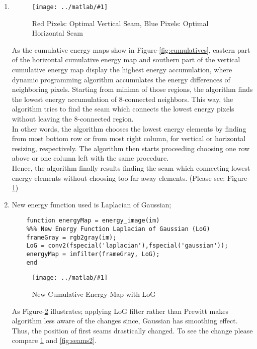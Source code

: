 \documentclass{article}
\newcommand{\listFigure}[3]{
	\begin{figure}[H]
		\texttt{[image: ../matlab/\#1]}
		\caption{#2\label{fig:#3}}
	\end{figure}		
}
\begin{document}
\begin{enumerate}
	\item
	\listFigure{seams.png}{Red Pixels: Optimal Vertical Seam, Blue
	Pixels: Optimal Horizontal Seam}{seams}
	As the cumulative energy maps show in Figure-\ref{fig:cumulatives}, eastern
	part of the horizontal cumulative energy map and southern part of the vertical
	cumulative energy map display the highest energy accumulation, where dynamic
	programming algorithm accumulates the energy differences of neighboring pixels.
	Starting from minima of those regions, the algorithm finds the lowest energy
	accumulation of 8-connected neighbors. This way, the algorithm tries to find
	the seam which connects the lowest energy pixels without leaving the
	8-connected region. \\
	In other words, the algorithm chooses the lowest energy
	elements by finding from most bottom row or from most right column, for
	vertical or horizontal resizing, respectively. The algorithm then starts proceeding
	choosing one row above or one column left with the same procedure. \\
	Hence, the algorithm finally results finding the seam which connecting lowest
	energy elements without choosing too far away elements.
	(Please see: Figure-\ref{fig:seams})
	\item
	New energy function used is Laplacian of Gaussian;
	\begin{lstlisting}
	function energyMap = energy_image(im)
	%%% New Energy Function Laplacian of Gaussian (LoG)
	frameGray = rgb2gray(im);  
	LoG = conv2(fspecial('laplacian'),fspecial('gaussian'));
	energyMap = imfilter(frameGray, LoG); 
	end		
	\end{lstlisting}	
	\listFigure{cumulatives-2.png}{New Cumulative Energy Map with
	LoG}{cumulatives2}
	As Figure-\ref{fig:cumulatives2} illustrates; applying LoG filter rather than
	Prewitt makes algorithm less aware of the changes since, Gaussian has smoothing
	effect. Thus, the position of first seams drastically changed. To see the
	change please compare \ref{fig:seams} and \ref{fig:seams2}.

\end{enumerate}
\end{document}
